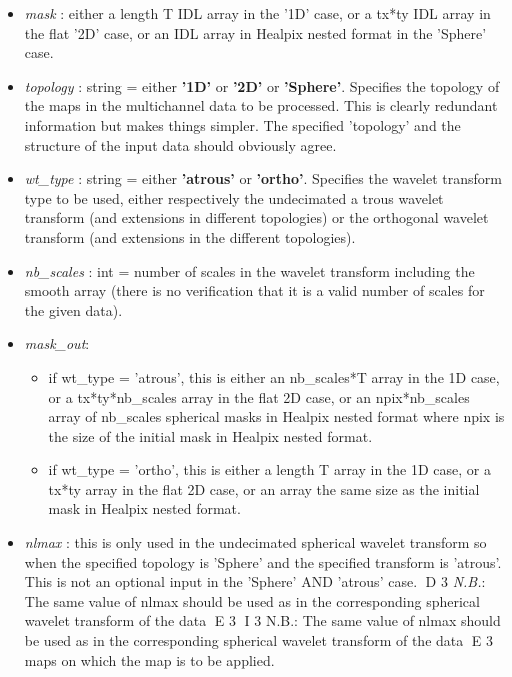 \begin{itemize}
\item {\em mask} : either a length T IDL array in the '1D' case, or a tx*ty IDL array in the flat '2D' case, 
or an IDL array in Healpix nested format in the 'Sphere' case.

\item {\em topology} : string = either \textbf{'1D'} or \textbf{'2D'} or \textbf{'Sphere'}. Specifies the topology 
of the maps in the multichannel data to be processed. This is clearly redundant information but makes things simpler. 
The specified 'topology' and the structure of the input data should obviously agree.

\item {\em wt\_type} : string  = either \textbf{'atrous'} or \textbf{'ortho'}. Specifies the wavelet transform type 
to be used, either respectively the undecimated a trous wavelet transform (and extensions in different topologies) 
or the orthogonal wavelet transform (and extensions in the different topologies).

\item {\em nb\_scales} : int = number of scales in the wavelet transform including the smooth array (there is no verification that it is a valid number of scales for the given data).

\item {\em mask\_out}:  
\begin{itemize}
\item{ if wt\_type = 'atrous'}, this is either an nb\_scales*T array in the 1D case, or a tx*ty*nb\_scales array 
in the flat 2D case, or an npix*nb\_scales array of nb\_scales spherical masks in Healpix nested format where npix 
is the size of the initial mask in Healpix nested format.
\item{ if wt\_type = 'ortho'}, this is either a length T array in the 1D case, or a tx*ty array in the flat 2D case, 
or an array the same size as the initial mask in Healpix nested format.		
\end{itemize}

\item {\em nlmax} : this is only used in the undecimated spherical wavelet transform so when the specified topology 
is 'Sphere' and the specified transform is 'atrous'. This is not an optional input in the 'Sphere' AND 'atrous' case. 
D 3
\emph{N.B.}: The same value of nlmax should be used as in the corresponding spherical wavelet transform of the data 
E 3
I 3
N.B.: The same value of nlmax should be used as in the corresponding spherical wavelet transform of the data 
E 3
maps on which the map is to be applied.
\end{itemize}


